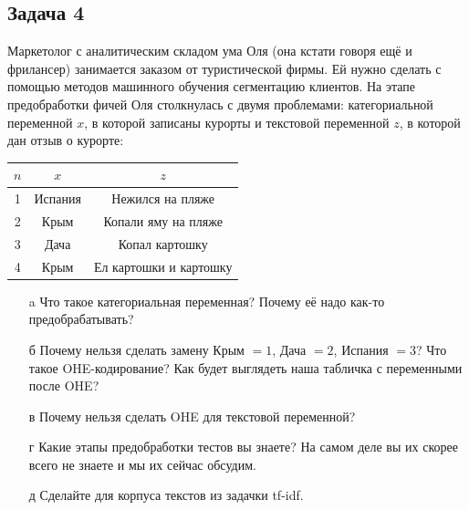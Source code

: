 \documentclass[12pt, a4paper, oneside]{article}
\begin{document}
\subsection*{Задача 4} 

Маркетолог с аналитическим складом ума Оля (она кстати говоря ещё и фрилансер) занимается заказом от туристической фирмы. Ей нужно сделать с помощью методов машинного обучения сегментацию клиентов. На этапе предобработки фичей Оля столкнулась с двумя проблемами: категориальной переменной $x$, в которой записаны курорты и текстовой переменной $z$, в которой дан отзыв о курорте:

\begin{center}
	\begin{tabular}{c|c|c}
		\hline
		$n$ & $x$ & $z$ \\
		\hline
		1 & Испания  & Нежился на пляже  \\
		2 & Крым  &  Копали яму на пляже\\
		3 & Дача  &  Копал картошку  \\
		4 & Крым  & Ел картошки и картошку \\
	\end{tabular}
\end{center}

\begin{enumerate} 
	\item[a]  Что такое категориальная переменная? Почему её надо как-то предобрабатывать? 
	\item[б]  Почему нельзя сделать замену Крым $=1$, Дача $=2$, Испания $=3$? Что такое OHE-кодирование? Как будет выглядеть наша табличка с переменными после OHE?
	\item[в]  Почему нельзя сделать OHE для текстовой переменной?
	\item[г]  Какие этапы предобработки тестов вы знаете? На самом деле вы их скорее всего не знаете и мы их сейчас обсудим. 
	\item[д] Сделайте для корпуса текстов из задачки tf-idf. 
\end{enumerate}
\end{document}
